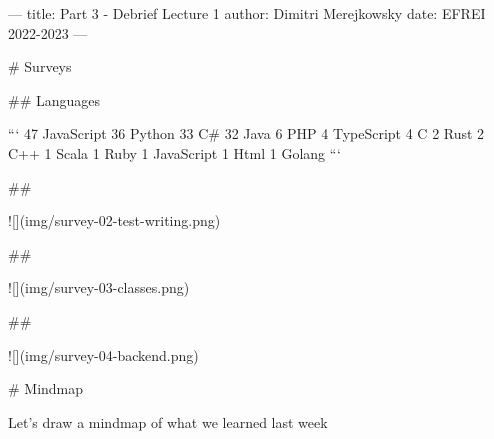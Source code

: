 ---
title: Part 3 - Debrief Lecture 1
author: Dimitri Merejkowsky
date: EFREI 2022-2023
---

# Surveys

## Languages

```
 47 JavaScript
 36 Python
 33 C#
 32 Java
  6 PHP
  4 TypeScript
  4 C
  2 Rust
  2 C++
  1 Scala
  1 Ruby
  1 JavaScript
  1 Html
  1 Golang
```


##

![](img/survey-02-test-writing.png)

##

![](img/survey-03-classes.png)

##

![](img/survey-04-backend.png)


# Mindmap

Let's draw a mindmap of what we learned last week
